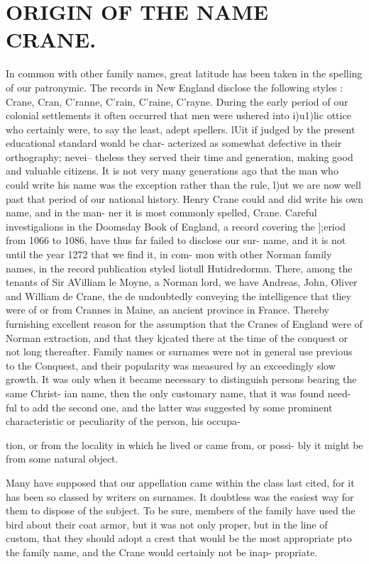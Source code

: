 \documentclass{book}
\begin{document}
\chapter{ORIGIN OF THE NAME CRANE.}


In common with other family names, great latitude has been 
taken in the spelling of our patronymic. The records in New 
England disclose the following styles : Crane, Cran, C'ranne, 
C'rain, C'raine, C'rayne. During the early period of our colonial 
settlements it often occurred that men were ushered into i)u1)lic 
ottice who certainly were, to say the least, adept spellers. lUit 
if judged by the present educational standard wonld be char- 
acterized as somewhat defective in their orthography; nevei-- 
theless they served their time and generation, making good and 
valuable citizens. It is not very many generations ago that the 
man who could write his name was the exception rather than the 
rule, l)ut we are now well past that period of our national history. 
Henry Crane could and did write his own name, and in the man- 
ner it is most commonly spelled, Crane. Careful investigalions 
in the Doomsday Book of England, a record covering the ];eriod 
from 1066 to 1086, have thus far failed to disclose our sur- 
name, and it is not until the year 1272 that we find it, in com- 
mon with other Norman family names, in the record publication 
styled liotull Hutidredormn. There, among the tenants of Sir 
AVilliam le Moyne, a Norman lord, we have Andreas, John, 
Oliver and William de Crane, the de undoubtedly conveying the 
intelligence that tliey were of or from Crannes in Maine, an 
ancient province in France. Thereby furnishing excellent reason 
for the assumption that the Cranes of England were of Norman 
extraction, and that they kjcated there at the time of the conquest 
or not long thereafter. Family names or surnames were not in 
general use previous to the Conquest, and their popularity was 
measured by an exceedingly slow growth. It was only when it 
became necessary to distinguish persons bearing the same Christ- 
ian name, then the only customary name, that it was found need- 
ful to add the second one, and the latter was suggested by some 
prominent characteristic or peculiarity of the person, his occupa- 




tion, or from the locality in which he lived or came from, or possi- 
bly it might be from some natural object. 

Many have supposed that our appellation came within the class 
last cited, for it has been so classed by writers on surnames. It 
doubtless was the easiest way for them to dispose of the subject. 
To be sure, members of the family have used the bird about their 
coat armor, but it was not only proper, but in the line of custom, 
that they should adopt a crest that would be the most appropriate 
pto the family name, and the Crane would certainly not be inap- 
propriate. 
\end{document}

